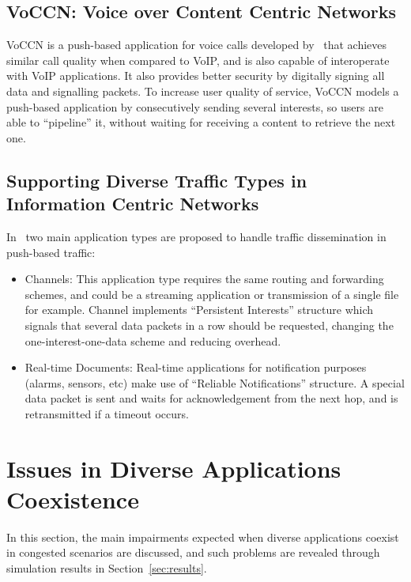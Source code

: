 \documentclass[11pt,conference]{./IEEEtran}
\begin{document}
	\subsection{VoCCN: Voice over Content Centric Networks}

	VoCCN is a push-based application for voice calls developed by~\cite{Jacobson09} that achieves similar call quality when compared to VoIP, and is also capable of interoperate with VoIP applications. It also provides better security by digitally signing all data and signalling packets. To increase user quality of service, VoCCN models a push-based application by consecutively sending several interests, so users are able to ``pipeline'' it, without waiting for receiving a content to retrieve the next one.


	\subsection{Supporting Diverse Traffic Types in Information Centric Networks}

	In~\cite{Tsilopoulos11} two main application types are proposed to handle traffic dissemination in push-based traffic:

		\begin{itemize}
			\item Channels: This application type requires the same routing and forwarding schemes, and could be a streaming application or transmission of a single file for example. Channel implements ``Persistent Interests'' structure which signals that several data packets in a row should be requested, changing the one-interest-one-data scheme and reducing overhead. 

			\item Real-time Documents: Real-time applications for notification purposes (alarms, sensors, etc) make use of ``Reliable Notifications'' structure. A special data packet is sent and waits for acknowledgement from the next hop, and is retransmitted if a timeout occurs. 
		\end{itemize}


	\section{Issues in Diverse Applications Coexistence}  \label{sec:coexistence}

	In this section, the main impairments expected when diverse applications coexist in congested scenarios are discussed, and such problems are revealed through simulation results in Section~\ref{sec:results}.
\end{document}
